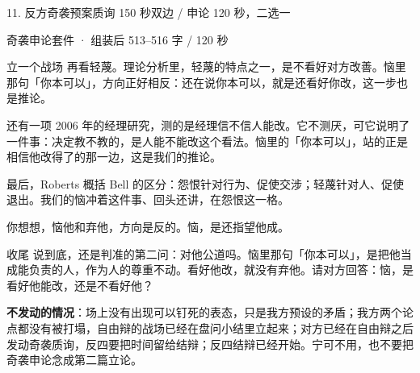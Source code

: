 \documentclass[script,con]{debate}
\begin{document}
\begin{stage}{11. 反方奇袭预案}{质询 150 秒双边 / 申论 120 秒，二选一}
\begin{kit}{奇袭申论}{套件 · 组装后 513–516 字 / 120 秒}
\begin{fixed}{立一个战场}
再看轻蔑。理论分析里，轻蔑的特点之一，是不看好对方改善。恼里那句「你本可以」，方向正好相反：还在说你本可以，就是还看好你改，这一步也是推论。

还有一项 2006 年的经理研究，测的是经理信不信人能改。它不测厌，可它说明了一件事：决定教不教的，是人能不能改这个看法。恼里的「你本可以」，站的正是相信他改得了的那一边，这是我们的推论。

最后，Roberts 概括 Bell 的区分：怨恨针对行为、促使交涉；轻蔑针对人、促使退出。我们的恼冲着这件事、回头还讲，在怨恨这一格。

你想想，恼他和弃他，方向是反的。恼，是还指望他成。
\end{fixed}
\begin{fixed}{收尾}
说到底，还是判准的第二问：对他公道吗。恼里那句「你本可以」，是把他当成能负责的人，作为人的尊重不动。看好他改，就没有弃他。请对方回答：恼，是看好他能改，还是不看好他？
\end{fixed}
\end{kit}
\textbf{不发动的情况}：场上没有出现可以钉死的表态，只是我方预设的矛盾；我方两个论点都没有被打塌，自由辩的战场已经在盘问小结里立起来；对方已经在自由辩之后发动奇袭质询，反四要把时间留给结辩；反四结辩已经开始。宁可不用，也不要把奇袭申论念成第二篇立论。
\end{stage}
\end{document}
